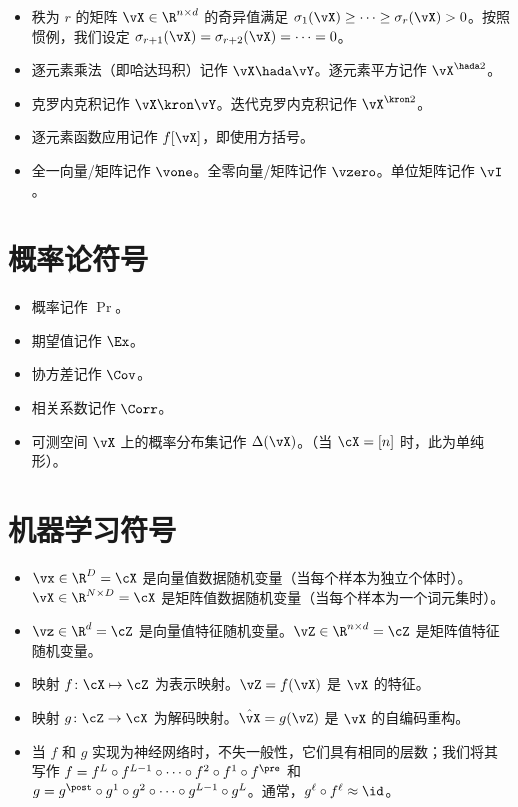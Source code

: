 \begin{itemize}
    \item 秩为 \(r\) 的矩阵 \(\vX \in \R^{n \times d}\) 的奇异值满足 \(\sigma_{1}(\vX) \geq \cdots \geq \sigma_{r}(\vX) > 0\)。按照惯例，我们设定 \(\sigma_{r + 1}(\vX) = \sigma_{r + 2}(\vX) = \cdots = 0\)。
    \item 逐元素乘法（即哈达玛积）记作 \(\vX \hada \vY\)。逐元素平方记作 
    $\vX^{\hada 2}$。
    \item 克罗内克积记作 $\vX \kron \vY$。迭代克罗内克积记作 $\vX^{\kron 2}$。
    \item 逐元素函数应用记作 \(f[\vX]\)，即使用方括号。
    \item 全一向量/矩阵记作 \(\vone\)。全零向量/矩阵记作 \(\vzero\)。单位矩阵记作 \(\vI\)。
\end{itemize}

\section*{概率论符号}

\begin{itemize}
    \item 概率记作 \(\Pr\)。
    \item 期望值记作 \(\Ex\)。 
    \item 协方差记作 \(\Cov\)。 
    \item 相关系数记作 \(\Corr\)。
    \item 可测空间 \(\vX\) 上的概率分布集记作 \(\Delta(\vX)\)。（当 \(\cX = [n]\) 时，此为单纯形）。
\end{itemize}

\section*{机器学习符号}

\begin{itemize}
    \item \(\vx \in \R^{D} = \cX\) 是向量值数据随机变量（当每个样本为独立个体时）。\(\vX \in \R^{N \times D} = \cX\) 是矩阵值数据随机变量（当每个样本为一个词元集时）。
    \item \(\vz \in \R^{d} = \cZ\) 是向量值特征随机变量。\(\vZ \in \R^{n \times d} = \cZ\) 是矩阵值特征随机变量。
    \item 映射 \(f \colon \cX \mapsto \cZ\) 为表示映射。\(\vZ = f(\vX)\) 是 \(\vX\) 的特征。
    \item 映射 \(g \colon \cZ \to \cX\) 为解码映射。\(\hat{\vX} = g(\vZ)\) 是 \(\vX\) 的自编码重构。 %
    \item 当 \(f\) 和 \(g\) 实现为神经网络时，不失一般性，它们具有相同的层数；我们将其写作 \(f = f^{L} \circ f^{L - 1} \circ \cdots \circ f^{2} \circ f^{1} \circ f^{\pre}\) 和 \(g = g^{\post} \circ g^{1} \circ g^{2} \circ \cdots \circ g^{L - 1} \circ g^{L}\)。通常，{\(g^{\ell} \circ f^{\ell} \approx \id\)}。
\end{itemize}
